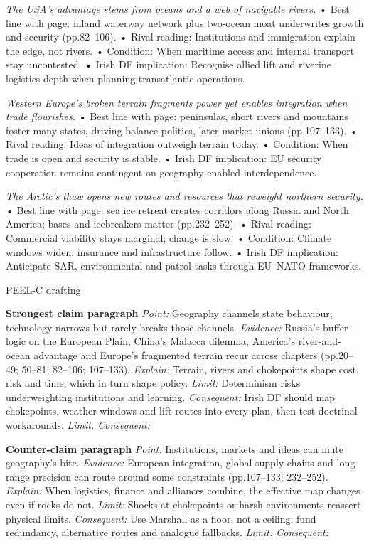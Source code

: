 \textit{The USA’s advantage stems from oceans and a web of navigable rivers.}
• Best line with page: inland waterway network plus two-ocean moat underwrites growth and security (pp.82–106).
• Rival reading: Institutions and immigration explain the edge, not rivers.
• Condition: When maritime access and internal transport stay uncontested.
• Irish DF implication: Recognise allied lift and riverine logistics depth when planning transatlantic operations.

\textit{Western Europe’s broken terrain fragments power yet enables integration when trade flourishes.}
• Best line with page: peninsulas, short rivers and mountains foster many states, driving balance politics, later market unions (pp.107–133).
• Rival reading: Ideas of integration outweigh terrain today.
• Condition: When trade is open and security is stable.
• Irish DF implication: EU security cooperation remains contingent on geography-enabled interdependence.

\textit{The Arctic’s thaw opens new routes and resources that reweight northern security.}
• Best line with page: sea ice retreat creates corridors along Russia and North America; bases and icebreakers matter (pp.232–252).
• Rival reading: Commercial viability stays marginal; change is slow.
• Condition: Climate windows widen; insurance and infrastructure follow.
• Irish DF implication: Anticipate SAR, environmental and patrol tasks through EU–NATO frameworks.

PEEL-C drafting

\textbf{Strongest claim paragraph}
\textit{Point:} Geography channels state behaviour; technology narrows but rarely breaks those channels.
\textit{Evidence:} Russia’s buffer logic on the European Plain, China’s Malacca dilemma, America’s river-and-ocean advantage and Europe’s fragmented terrain recur across chapters (pp.20–49; 50–81; 82–106; 107–133).
\textit{Explain:} Terrain, rivers and chokepoints shape cost, risk and time, which in turn shape policy.
\textit{Limit:} Determinism risks underweighting institutions and learning.
\textit{Consequent:} Irish DF should map chokepoints, weather windows and lift routes into every plan, then test doctrinal workarounds. \textit{Limit. Consequent:}

\textbf{Counter-claim paragraph}
\textit{Point:} Institutions, markets and ideas can mute geography’s bite.
\textit{Evidence:} European integration, global supply chains and long-range precision can route around some constraints (pp.107–133; 232–252).
\textit{Explain:} When logistics, finance and alliances combine, the effective map changes even if rocks do not.
\textit{Limit:} Shocks at chokepoints or harsh environments reassert physical limits.
\textit{Consequent:} Use Marshall as a floor, not a ceiling; fund redundancy, alternative routes and analogue fallbacks. \textit{Limit. Consequent:}

